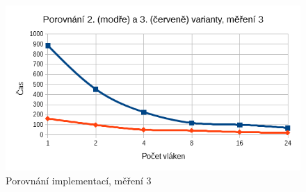 \documentclass[12pt]{article}
\begin{document}
\begin{figure}[h]
  \begin{center}
      \includegraphics[width=12cm]{images/vs3.png}	
    \caption{Porovnání implementací, měření 3}
  \end{center}
\end{figure}
\end{document}
